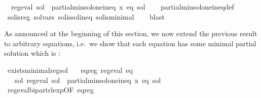 \begin{isabellebody}
\ \ {\isachardoublequoteopen}reg{\isacharunderscore}{\kern0pt}eval\ sol\ {\isasymand}\ partial{\isacharunderscore}{\kern0pt}min{\isacharunderscore}{\kern0pt}sol{\isacharunderscore}{\kern0pt}one{\isacharunderscore}{\kern0pt}ineq\ x\ eq\ sol{\isachardoublequoteclose}\isanewline
%
\isadelimproof
\ \ %
\endisadelimproof
%
\isatagproof
{}\isamarkupfalse%
\ partial{\isacharunderscore}{\kern0pt}min{\isacharunderscore}{\kern0pt}sol{\isacharunderscore}{\kern0pt}one{\isacharunderscore}{\kern0pt}ineq{\isacharunderscore}{\kern0pt}def\isanewline
\ \ \isamarkupfalse%
\ sol{\isacharunderscore}{\kern0pt}is{\isacharunderscore}{\kern0pt}reg\ sol{\isacharunderscore}{\kern0pt}vars\ sol{\isacharunderscore}{\kern0pt}is{\isacharunderscore}{\kern0pt}sol{\isacharunderscore}{\kern0pt}ineq\ sol{\isacharunderscore}{\kern0pt}is{\isacharunderscore}{\kern0pt}minimal\isanewline
\ \ \isamarkupfalse%
\ blast%
\endisatagproof
{\isafoldproof}%
%
\isadelimproof
\isanewline
%
\endisadelimproof
\isanewline
{}\isamarkupfalse%
%
\begin{isamarkuptext}%
As announced at the beginning of this section, we now extend the previous result to arbitrary
equations, i.e.\ we show that each equation has some minimal partial solution which is
:%
\end{isamarkuptext}\isamarkuptrue%
\isamarkupfalse%
\ exists{\isacharunderscore}{\kern0pt}minimal{\isacharunderscore}{\kern0pt}reg{\isacharunderscore}{\kern0pt}sol{\isacharcolon}{\kern0pt}\isanewline
\ \ \ eq{\isacharunderscore}{\kern0pt}reg{\isacharcolon}{\kern0pt}\ {\isachardoublequoteopen}reg{\isacharunderscore}{\kern0pt}eval\ eq{\isachardoublequoteclose}\isanewline
\ \ \ {\isachardoublequoteopen}{\isasymexists}sol{\isachardot}{\kern0pt}\ reg{\isacharunderscore}{\kern0pt}eval\ sol\ {\isasymand}\ partial{\isacharunderscore}{\kern0pt}min{\isacharunderscore}{\kern0pt}sol{\isacharunderscore}{\kern0pt}one{\isacharunderscore}{\kern0pt}ineq\ x\ eq\ sol{\isachardoublequoteclose}\isanewline
%
\isadelimproof
%
\endisadelimproof
%
\isatagproof
{}\isamarkupfalse%
\ {\isacharminus}{\kern0pt}\isanewline
\ \ \isamarkupfalse%
\ reg{\isacharunderscore}{\kern0pt}eval{\isacharunderscore}{\kern0pt}bipart{\isacharunderscore}{\kern0pt}rlexp{\isacharbrackleft}{\kern0pt}OF\ eq{\isacharunderscore}{\kern0pt}reg{\isacharbrackright}{\kern0pt}\ \isamarkupfalse%

\end{isabellebody}
